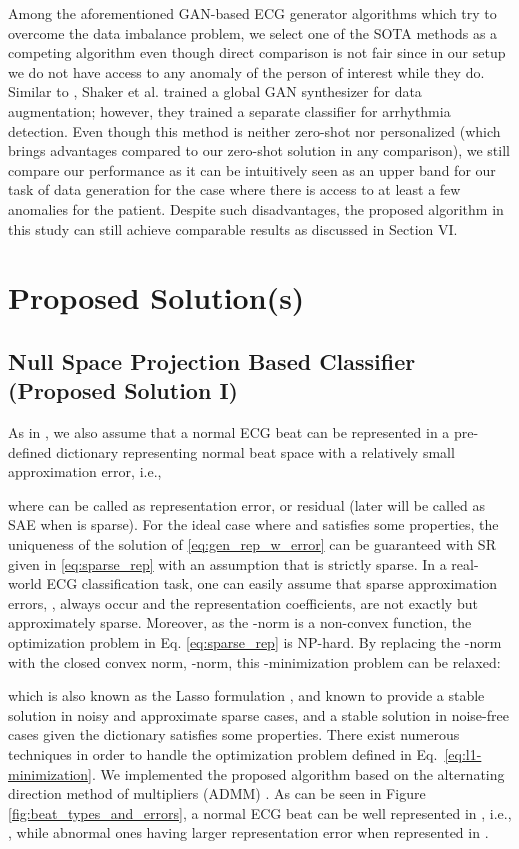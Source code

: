 \documentclass[journal,transmag]{IEEEtran}
\begin{document}
Among the aforementioned GAN-based ECG generator algorithms which try to overcome the data imbalance problem, we select one of the SOTA methods \cite{shaker2020generalization} as a competing algorithm even though direct comparison is not fair since in our setup we do not have access to any anomaly of the person of interest while they do. Similar to \cite{zhou2021fully}, Shaker et al. \cite{shaker2020generalization} trained a global GAN synthesizer for data augmentation; however, they trained a separate classifier for arrhythmia detection. Even though this method is neither zero-shot nor personalized (which brings advantages compared to our zero-shot solution in any comparison), we still compare our performance as it can be intuitively seen as an upper band for our task of data generation for the case where there is access to at least a few anomalies for the patient. Despite such disadvantages, the proposed algorithm in this study can still achieve comparable results as discussed in Section VI.

\section{Proposed Solution(s)}
\label{sec:proposed}
\subsection{Null Space Projection Based Classifier (Proposed Solution I)} \label{sec:NPE}
As in \cite{carrera2016ecg}, we also assume that a normal ECG beat can be represented in a pre-defined dictionary representing normal beat space with a relatively small approximation error, i.e., 

where  can be called as representation error, or residual (later will be called as SAE when  is sparse). For the ideal case where  and  satisfies some properties, the uniqueness of the solution of \eqref{eq:gen_rep_w_error} can be guaranteed \cite{RIP} with SR given in \eqref{eq:sparse_rep} with an assumption that  is strictly sparse. In a real-world ECG classification task, one can easily assume that sparse approximation errors, , always occur and the representation coefficients,  are not exactly but approximately sparse. Moreover, as the -norm is a non-convex function, the optimization problem in Eq. \eqref{eq:sparse_rep} is NP-hard. By replacing the -norm with the closed convex norm, -norm, this -minimization problem can be relaxed:   

which is also known as the Lasso formulation \cite{lasso}, and known to provide a stable solution in noisy and approximate sparse cases, and a stable solution in noise-free cases \cite{lasso-stable} given the dictionary satisfies some properties. There exist numerous techniques in order to handle the optimization problem defined in Eq.~\eqref{eq:l1-minimization}. We implemented the proposed algorithm based on the alternating direction method of multipliers (ADMM) \cite{ADMM}. As can be seen in Figure \ref{fig:beat_types_and_errors}, a normal ECG beat  can be well represented in , i.e., , while abnormal ones having larger representation error when represented in . 
\end{document}
